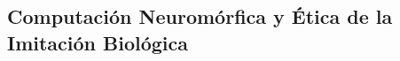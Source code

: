 \begin{refsection}
\chapter{Computación Neuromórfica y Ética de la Imitación Biológica}
\label{chapter:chapter-14}

%
\begin{comment}
\begin{enumerate}
\item \textbf{Computación Neuromórfica y Ética de la Imitación Biológica (Capítulo 14):}  
\begin{itemize}
    \item Reflexión sobre riesgos de replicar sistemas biológicos en computación.
    \item Aplicaciones en salud y análisis en tiempo real.
    \item Actividad: Modelar una red neuromórfica básica con \texttt{NEST}.
\end{itemize}
\end{enumerate}
\end{comment}


\nocite{*}

\printbibliography[heading=subbibliography, title={Bibliografía del Capítulo 14}]
\end{refsection}
\textbf{}